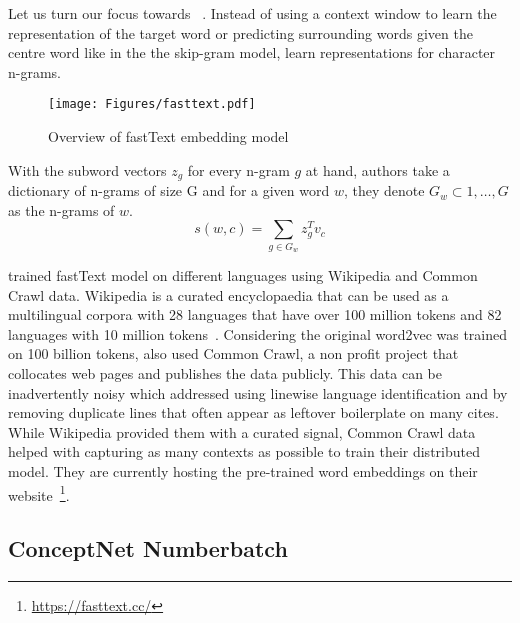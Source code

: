 Let us turn our focus towards ~\cite{bojanowski_enriching_2016}.
Instead of using a context window to learn the representation of the target word or predicting surrounding words given the centre word like in the the skip-gram model, \citeauthor{bojanowski_enriching_2016} learn representations for character n-grams.

\begin{figure}[htbp]
    \centering
    \texttt{[image: Figures/fasttext.pdf]}
    \caption{Overview of fastText embedding model}%
    \label{fig:fasttext}
\end{figure}

With the subword vectors $z_g$ for every n-gram $g$ at hand, authors take a dictionary of n-grams of size G and for a given word $w$, they denote $G_{w} \subset {1, \dots, G}$ as the n-grams of $w$.
\begin{displaymath}
    s(w,c) = \sum_{g \in G_{w}}z_{g}^T v_c
\end{displaymath}

\textcite{grave_learning_2018} trained fastText model on different languages using Wikipedia and Common Crawl data.
Wikipedia is a curated encyclopaedia that can be used as a multilingual corpora with 28 languages that have over 100 million tokens and 82 languages with 10 million tokens~\cite{grave_learning_2018}.
Considering the original word2vec was trained on 100 billion tokens, \citeauthor{grave_learning_2018} also used Common Crawl, a non profit project that collocates web pages and publishes the data publicly.
This data can be inadvertently noisy which \citeauthor{grave_learning_2018} addressed using linewise language identification and by removing duplicate lines that often appear as leftover boilerplate on many cites.
While Wikipedia provided them with a curated signal, Common Crawl data helped with capturing as many contexts as possible to train their distributed model.
They are currently hosting the pre-trained word embeddings on their website~\footnote{\url{https://fasttext.cc/}}.

\subsection{ConceptNet Numberbatch}%
\label{sub:conceptnet_numberbatch}


